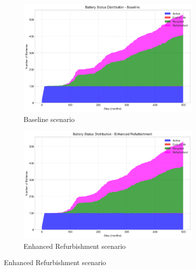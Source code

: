 \begin{figure}[htbp]
\centering
\begin{subfigure}{0.42\textwidth}
    \includegraphics[width=\textwidth]{figures/baseline_battery_status.png}
    \caption{Baseline scenario}
    \label{fig:battery_baseline}
\end{subfigure}
\hfill
\begin{subfigure}{0.42\textwidth}
    \includegraphics[width=\textwidth]{figures/enhanced_refurbishment_battery_status.png}
    \caption{Enhanced Refurbishment scenario}
    \label{fig:battery_enhanced}
\end{subfigure}


\end{figure}
